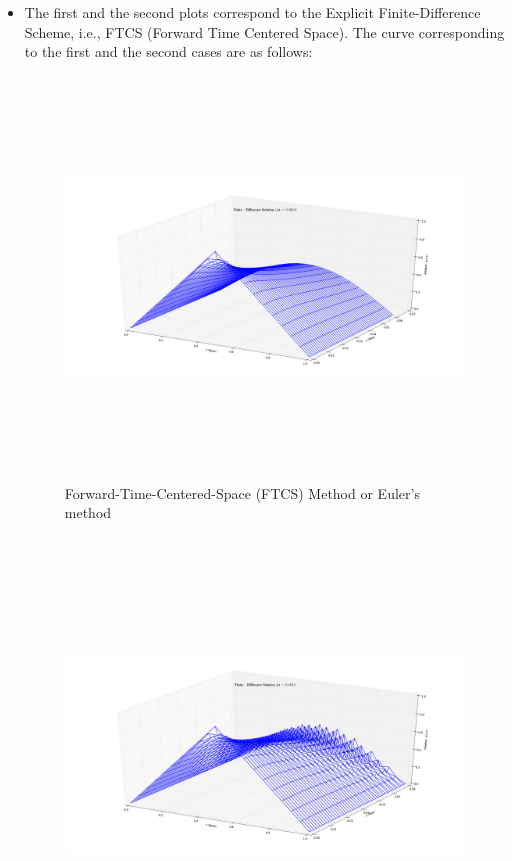 \begin{itemize}
\item The first and the second plots correspond to the Explicit Finite-Difference Scheme, i.e., FTCS (Forward Time Centered Space). The curve corresponding to the first and the second cases are as follows: 
\begin{figure}[H]
\includegraphics[width=7in, height=4.2in]{Fig1}
\caption{Forward-Time-Centered-Space (FTCS) Method or Euler's method }
\end{figure}
\begin{figure}[H]
\includegraphics[width=7in, height=4.5in]{Fig2}

\end{figure}
\end{itemize}
